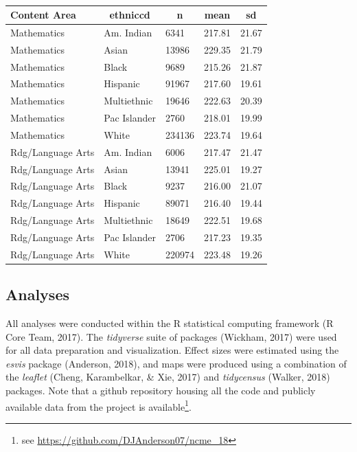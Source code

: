 \documentclass[man, fleqn, noextraspace]{apa6}
\theoremstyle{definition}
\theoremstyle{definition}
\theoremstyle{definition}
\theoremstyle{remark}
\begin{document}
\begin{table}[tbp]
\begin{center}
\begin{threeparttable}
\caption{\label{tab:descrips}}
\begin{tabular}{lllll}
\toprule
Content Area & \multicolumn{1}{c}{ethniccd} & \multicolumn{1}{c}{n} & \multicolumn{1}{c}{mean} & \multicolumn{1}{c}{sd}\\
\midrule
Mathematics & Am. Indian & 6341 & 217.81 & 21.67\\
Mathematics & Asian & 13986 & 229.35 & 21.79\\
Mathematics & Black & 9689 & 215.26 & 21.87\\
Mathematics & Hispanic & 91967 & 217.60 & 19.61\\
Mathematics & Multiethnic & 19646 & 222.63 & 20.39\\
Mathematics & Pac Islander & 2760 & 218.01 & 19.99\\
Mathematics & White & 234136 & 223.74 & 19.64\\
Rdg/Language Arts & Am. Indian & 6006 & 217.47 & 21.47\\
Rdg/Language Arts & Asian & 13941 & 225.01 & 19.27\\
Rdg/Language Arts & Black & 9237 & 216.00 & 21.07\\
Rdg/Language Arts & Hispanic & 89071 & 216.40 & 19.44\\
Rdg/Language Arts & Multiethnic & 18649 & 222.51 & 19.68\\
Rdg/Language Arts & Pac Islander & 2706 & 217.23 & 19.35\\
Rdg/Language Arts & White & 220974 & 223.48 & 19.26\\
\bottomrule
\end{tabular}
\end{threeparttable}
\end{center}
\end{table}

\hypertarget{analyses}{%
\subsection{Analyses}\label{analyses}}

All analyses were conducted within the R statistical computing framework
(R Core Team, 2017). The \emph{tidyverse} suite of packages (Wickham,
2017) were used for all data preparation and visualization. Effect sizes
were estimated using the \emph{esvis} package (Anderson, 2018), and maps
were produced using a combination of the \emph{leaflet} (Cheng,
Karambelkar, \& Xie, 2017) and \emph{tidycensus} (Walker, 2018)
packages. Note that a github repository housing all the code and
publicly available data from the project is available\footnote{see
  \url{https://github.com/DJAnderson07/ncme_18}}.
\end{document}

